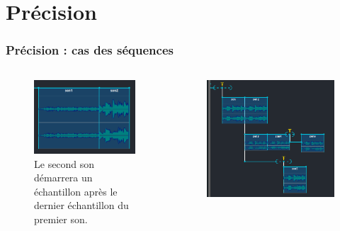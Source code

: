 \documentclass[draft]{beamer}
\begin{document}
\section{Précision}
\begin{frame}
	\frametitle{Précision : cas des séquences}
	\Large
	
	\begin{columns}
		\begin{column}{0.5\textwidth}
			\begin{figure}
				\centering
				\includegraphics[width=\textwidth]{images/sequence.png}
				\caption{Le second son démarrera un échantillon après le dernier échantillon du premier son.}
			\end{figure}
		\end{column}
		\begin{column}{0.5\textwidth}
			\begin{figure}
				\centering
				\includegraphics[width=\textwidth]{images/triggers.png}

\end{figure}
\end{column}
\end{columns}
\end{frame}
\end{document}
